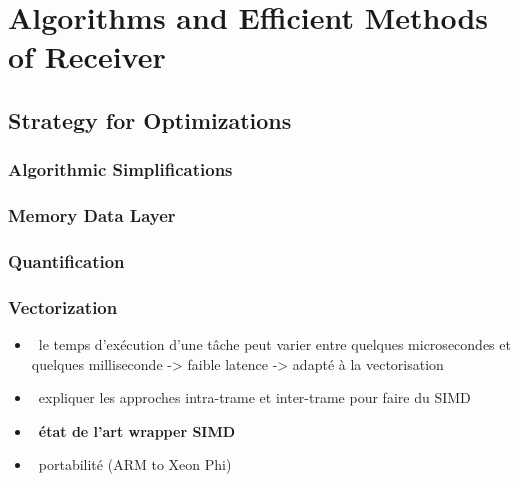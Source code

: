 \graphicspath{{main/chapter2/fig/}}

\chapter{Algorithms and Efficient Methods of Receiver}

\section{Strategy for Optimizations}

\subsection{Algorithmic Simplifications}

\subsection{Memory Data Layer}

\subsection{Quantification}

\subsection{Vectorization~\cite{Cassagne2018}}

\begin{itemize}
  \item \xmark~le temps d'exécution d'une tâche peut varier entre quelques
    microsecondes et quelques milliseconde -> faible latence -> adapté à la
    vectorisation
  \item \xmark~expliquer les approches intra-trame et inter-trame pour faire du
    SIMD
  \item \cmark~\textbf{état de l'art wrapper SIMD}
  \item \cmark~portabilité (ARM to Xeon Phi)
\end{itemize}

